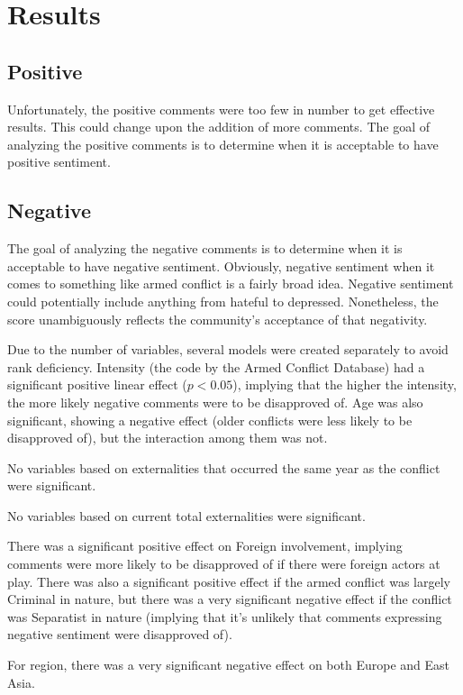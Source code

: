 \section{Results}
\subsection{Positive}
Unfortunately, the positive comments were too few in number to get effective results. This could change upon the addition of more comments. The goal of analyzing the positive comments is to determine when it is acceptable to have positive sentiment.

\subsection{Negative}
The goal of analyzing the negative comments is to determine when it is acceptable to have negative sentiment. Obviously, negative sentiment when it comes to something like armed conflict is a fairly broad idea. Negative sentiment could potentially include anything from hateful to depressed. Nonetheless, the score unambiguously reflects the community's acceptance of that negativity.

Due to the number of variables, several models were created separately to avoid rank deficiency. Intensity (the code by the Armed Conflict Database) had a significant positive linear effect ($p < 0.05$), implying that the higher the intensity, the more likely negative comments were to be disapproved of. Age was also significant, showing a negative effect (older conflicts were less likely to be disapproved of), but the interaction among them was not.

No variables based on externalities that occurred the same year as the conflict were significant.

No variables based on current total externalities were significant.

There was a significant positive effect on Foreign involvement, implying comments were more likely to be disapproved of if there were foreign actors at play. There was also a significant positive effect if the armed conflict was largely Criminal in nature, but there was a very significant negative effect if the conflict was Separatist in nature (implying that it's unlikely that comments expressing negative sentiment were disapproved of).

For region, there was a very significant negative effect on both Europe and East Asia.